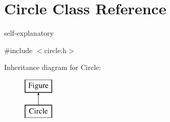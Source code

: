\hypertarget{class_circle}{}\section{Circle Class Reference}
\label{class_circle}


self-\/explanatory  




{\ttfamily \#include $<$circle.\+h$>$}

Inheritance diagram for Circle\+:\begin{figure}[H]
\begin{center}
\leavevmode
\includegraphics[height=2.000000cm]{class_circle}
\end{center}
\end{figure}
